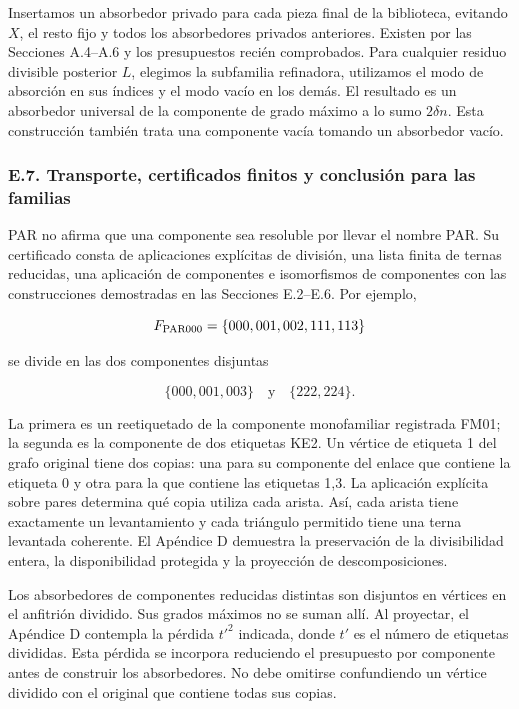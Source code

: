 \documentclass[spanish,11pt,a4paper]{article}
\begin{document}
Insertamos un absorbedor privado para cada pieza final de la biblioteca, evitando \(X\), el resto fijo y todos los absorbedores privados anteriores. Existen por las Secciones A.4--A.6 y los presupuestos recién comprobados. Para cualquier residuo divisible posterior \(L\), elegimos la subfamilia refinadora, utilizamos el modo de absorción en sus índices y el modo vacío en los demás. El resultado es un absorbedor universal de la componente de grado máximo a lo sumo \(2\delta n\). Esta construcción también trata una componente vacía tomando un absorbedor vacío.

\subsubsection{E.7. Transporte, certificados finitos y conclusión para las familias}\label{e.7.-transporte-certificados-finitos-y-conclusiuxf3n-para-las-familias}

PAR no afirma que una componente sea resoluble por llevar el nombre PAR. Su certificado consta de aplicaciones explícitas de división, una lista finita de ternas reducidas, una aplicación de componentes e isomorfismos de componentes con las construcciones demostradas en las Secciones E.2--E.6. Por ejemplo,

\[F_{\rm PAR000}=\{000,001,002,111,113\}\]

se divide en las dos componentes disjuntas

\[\{000,001,003\}\quad\text{y}\quad\{222,224\}.
\tag{E.7.1}\]

La primera es un reetiquetado de la componente monofamiliar registrada FM01; la segunda es la componente de dos etiquetas KE2. Un vértice de etiqueta 1 del grafo original tiene dos copias: una para su componente del enlace que contiene la etiqueta 0 y otra para la que contiene las etiquetas 1,3. La aplicación explícita sobre pares determina qué copia utiliza cada arista. Así, cada arista tiene exactamente un levantamiento y cada triángulo permitido tiene una terna levantada coherente. El Apéndice D demuestra la preservación de la divisibilidad entera, la disponibilidad protegida y la proyección de descomposiciones.

Los absorbedores de componentes reducidas distintas son disjuntos en vértices en el anfitrión dividido. Sus grados máximos no se suman allí. Al proyectar, el Apéndice D contempla la pérdida \(t'^2\) indicada, donde \(t'\) es el número de etiquetas divididas. Esta pérdida se incorpora reduciendo el presupuesto por componente antes de construir los absorbedores. No debe omitirse confundiendo un vértice dividido con el original que contiene todas sus copias.
\end{document}

